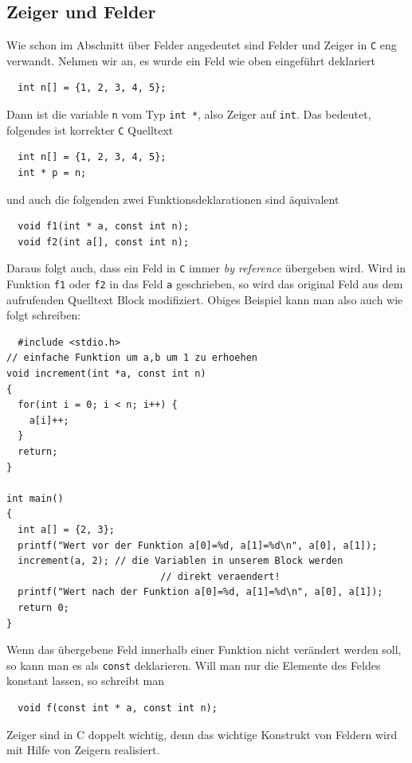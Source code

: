 \subsection{Zeiger und Felder}

Wie schon im Abschnitt über Felder angedeutet sind Felder und Zeiger in \texttt{C} eng verwandt.
Nehmen wir an, es wurde ein Feld wie oben eingeführt deklariert
\begin{lstlisting}
  int n[] = {1, 2, 3, 4, 5};
\end{lstlisting}
Dann ist die variable \verb|n| vom Typ \verb|int *|, also Zeiger auf \verb|int|.
Das bedeutet, folgendes ist korrekter \texttt{C} Quelltext
\begin{lstlisting}
  int n[] = {1, 2, 3, 4, 5};
  int * p = n;
\end{lstlisting}
und auch die folgenden zwei Funktionsdeklarationen sind äquivalent
\begin{lstlisting}
  void f1(int * a, const int n);
  void f2(int a[], const int n);
\end{lstlisting}
Daraus folgt auch, dass ein Feld in \texttt{C} immer \emph{by reference} übergeben wird.
Wird in Funktion \texttt{f1} oder \texttt{f2} in das Feld \texttt{a} geschrieben, so wird das original Feld aus dem aufrufenden Quelltext Block modifiziert.
Obiges Beispiel kann man also auch wie folgt schreiben:
\begin{lstlisting}
  #include <stdio.h>
// einfache Funktion um a,b um 1 zu erhoehen
void increment(int *a, const int n)
{
  for(int i = 0; i < n; i++) {
    a[i]++;
  }
  return;
}

int main()
{
  int a[] = {2, 3};
  printf("Wert vor der Funktion a[0]=%d, a[1]=%d\n", a[0], a[1]);
  increment(a, 2); // die Variablen in unserem Block werden
                           // direkt veraendert!
  printf("Wert nach der Funktion a[0]=%d, a[1]=%d\n", a[0], a[1]);
  return 0;
}
\end{lstlisting}
Wenn das übergebene Feld innerhalb einer Funktion nicht verändert werden soll, so kann man es als \verb|const| deklarieren.
Will man nur die Elemente des Feldes konstant lassen, so schreibt man
\begin{lstlisting}
  void f(const int * a, const int n);
\end{lstlisting}


Zeiger sind in C doppelt wichtig, denn das wichtige Konstrukt von Feldern wird mit Hilfe von Zeigern realisiert.

